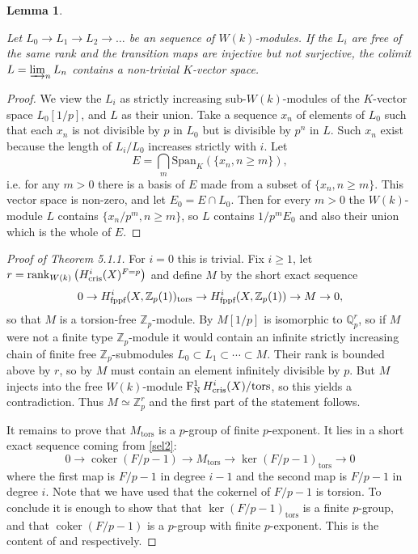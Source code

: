\documentclass[11pt]{article}
\theoremstyle{plain}
\newtheorem{Lem}[Thm]{Lemma}
\theoremstyle{definition}
\theoremstyle{remark}
\numberwithin{equation}{section}
\newenvironment{lemma}[1]%
    { \begin{Lem} \label{L:#1}}%
    { \end{Lem} }
\newcommand{\lem}[1]{\begin{lemma}{#1} \sl}
\newcommand{\elem}{\end{lemma}}
\newcommand{\prf}{ \begin{proof} }
\newcommand{\epr}{ \end{proof} }
\newcommand{\Zp}{\mathbb{Z}_p}
\newcommand{\Qp}{\mathbb{Q}_p}
\DeclareMathOperator{\rk}{rank}                                          %
\DeclareMathOperator{\coker}{coker}
\newcommand{\W}{W}                                                       %
\newcommand\Hflat[1]{H^{#1}_{\textnormal{fppf}}}                         %
\DeclareMathOperator{\Nyg}{F_N^1}                                      %
\newcommand\Hcris[1]{H^{#1}_{\textnormal{cris}}}                         %
\begin{document}
\lem{lemmapdiv}

Let $L_0\to L_1\to L_2\to\dots$ be an sequence of $\W(k)$-modules. If the $L_i$ are free of the same rank and the transition maps are injective but not surjective, the colimit $L=\varinjlim_nL_n$ contains a non-trivial $K$-vector space.

\elem

\prf

We view the $L_i$ as strictly increasing sub-$\W(k)$-modules of the $K$-vector space $L_0[1/p]$, and $L$ as their union. Take a sequence $x_n$ of elements of $L_0$ such that each $x_n$ is not divisible by $p$ in $L_0$ but is divisible by $p^n$ in $L$. Such $x_n$ exist because the length of $L_i/L_0$ increases strictly with $i$. Let 
\[
E=\bigcap_m\text{Span}_K(\{x_n,n\ge m\}),
\]
i.e. for any $m>0$ there is a basis of $E$ made from a subset of $\{x_n,n\ge m\}$. This vector space is non-zero, and let $E_0=E\cap L_0$. Then for every $m>0$ the $\W(k)$-module $L$ contains $\{x_n/p^m,n\ge m\}$, so $L$ contains $1/p^mE_0$ and also their union which is the whole of $E$.\epr


\prf[Proof of Theorem 5.1.1]
For $i=0$ this is trivial. Fix $i\ge1$, let $r=\rk_{\W(k)}\left(\Hcris{i}(X)^{F=p}\right)$ and define $M$ by the short exact sequence
\[
0\to \Hflat{i}(X,\Zp(1))_{\text{tors}}\to\Hflat{i}(X,\Zp(1))\to M\to0,
\]
so that $M$ is a torsion-free $\Zp$-module. By  $M[1/p]$ is isomorphic to $\Qp^r$, so if $M$ were not a finite type $\Zp$-module it would contain an infinite strictly increasing chain of finite free $\Zp$-submodules $L_0\subset L_1\subset\cdots\subset M$.  Their rank is bounded above by $r$, so by  $M$ must contain an element infinitely divisible by $p$. But $M$ injects into the free $\W(k)$-module $\Nyg\Hcris{i}(X)/\text{tors}$, so this yields a contradiction. Thus $M\simeq\Zp^r$ and the first part of the statement follows.

It remains to prove that $M_{\text{tors}}$ is a $p$-group of finite $p$-exponent. It lies in a short exact sequence coming from \cref{sel2}:
\[
0\to\coker\left(F/p-1\right)\to M_{\text{tors}}\to\ker\left(F/p-1\right)_{\text{tors}}\to0
\]
where the first map is $F/p-1$ in degree $i-1$ and the second map is $F/p-1$ in degree $i$. Note that we have used that the cokernel of $F/p-1$ is torsion. To conclude it is enough to show that that $\ker\left(F/p-1\right)_{\text{tors}}$ is a finite $p$-group, and that $\coker\left(F/p-1\right)$ is a $p$-group with finite $p$-exponent. This is the content of  and  respectively.\epr
\end{document}
